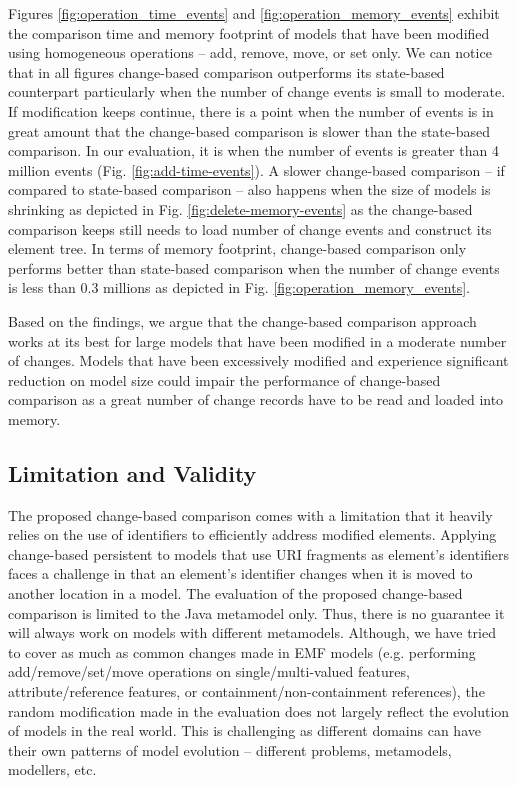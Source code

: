 \documentclass{jot}
\begin{document}
Figures \ref{fig:operation_time_events} and \ref{fig:operation_memory_events} exhibit the comparison time and memory footprint of models that have been modified using homogeneous operations -- \textsf{add}, \textsf{remove}, \textsf{move}, or \textsf{set} only. We can notice that in all figures change-based comparison outperforms its state-based counterpart particularly when the number of change events is small to moderate. If modification keeps continue, there is a point when the number of events is in great amount that the change-based comparison is slower than the state-based comparison. In our evaluation, it is when the number of events is greater than 4 million events (Fig. \ref{fig:add-time-events}). A slower change-based comparison -- if compared to state-based comparison -- also happens when the size of models is shrinking as depicted in Fig. \ref{fig:delete-memory-events} as the change-based comparison keeps still needs to load number of change events and construct its element tree. In terms of memory footprint, change-based comparison only performs better than state-based comparison when the number of change events is less than 0.3 millions as depicted in Fig. \ref{fig:operation_memory_events}.

Based on the findings, we argue that the change-based comparison approach works at its best for large models that have been modified in a moderate number of changes. Models that have been excessively modified and experience significant reduction on model size could impair the performance of change-based comparison as a great number of change records have to be read and loaded into memory. 

\subsection{Limitation and Validity}
\label{sec:limitation_and_Threat_to_validity}
The proposed change-based comparison comes with a limitation that it heavily relies on the use of identifiers to efficiently address modified elements. Applying change-based persistent to models that use URI fragments as element's identifiers faces a challenge in that an element's identifier changes when it is moved to another location in a model. The evaluation of the proposed change-based comparison is limited to the Java metamodel only. Thus, there is no guarantee it will always work on models with different metamodels. Although, we have tried to cover as much as common changes made in EMF models (e.g. performing \textsf{add}/\textsf{remove}/\textsf{set}/\textsf{move} operations on \textsf{single}/\textsf{multi}-\textsf{valued} features, \textsf{attribute}/\textsf{reference} features, or \textsf{containment}/\textsf{non}-\textsf{containment} references), the random modification made in the evaluation does not largely reflect the evolution of models in the real world. This is challenging as different domains can have their own patterns of model evolution -- different problems, metamodels, modellers, etc.
\end{document}
